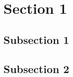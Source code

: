 \section{Section 1}
\blindtext

\subsection{Subsection 1}
\blindtext[2]

\subsection{Subsection 2}
\blindtext[3]